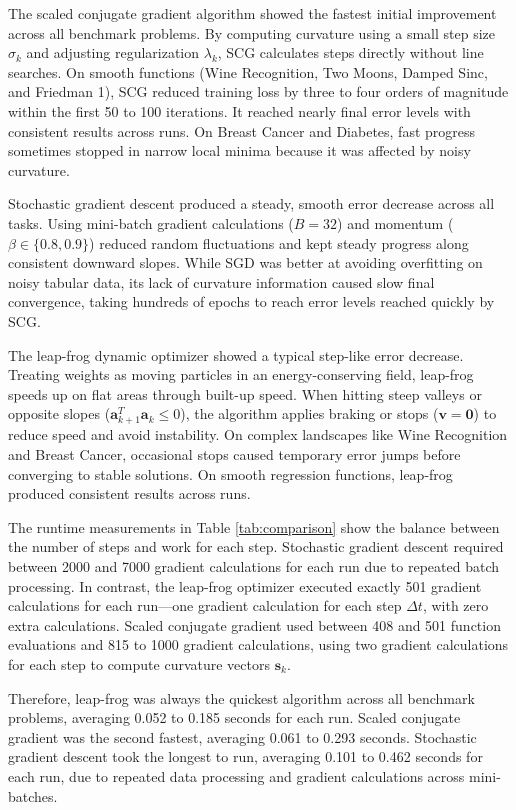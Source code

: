\documentclass[conference,10pt]{IEEEtran}
\begin{document}
The scaled conjugate gradient algorithm showed the fastest initial improvement across all benchmark problems. By computing curvature using a small step size $\sigma_k$ and adjusting regularization $\lambda_k$, SCG calculates steps directly without line searches. On smooth functions (Wine Recognition, Two Moons, Damped Sinc, and Friedman 1), SCG reduced training loss by three to four orders of magnitude within the first 50 to 100 iterations. It reached nearly final error levels with consistent results across runs. On Breast Cancer and Diabetes, fast progress sometimes stopped in narrow local minima because it was affected by noisy curvature.

Stochastic gradient descent produced a steady, smooth error decrease across all tasks. Using mini-batch gradient calculations ($B = 32$) and momentum ($\beta \in \{0.8, 0.9\}$) reduced random fluctuations and kept steady progress along consistent downward slopes. While SGD was better at avoiding overfitting on noisy tabular data, its lack of curvature information caused slow final convergence, taking hundreds of epochs to reach error levels reached quickly by SCG.

The leap-frog dynamic optimizer showed a typical step-like error decrease. Treating weights as moving particles in an energy-conserving field, leap-frog speeds up on flat areas through built-up speed. When hitting steep valleys or opposite slopes ($\mathbf{a}_{k+1}^T \mathbf{a}_k \le 0$), the algorithm applies braking or stops ($\mathbf{v} = \mathbf{0}$) to reduce speed and avoid instability. On complex landscapes like Wine Recognition and Breast Cancer, occasional stops caused temporary error jumps before converging to stable solutions. On smooth regression functions, leap-frog produced consistent results across runs.

The runtime measurements in Table \ref{tab:comparison} show the balance between the number of steps and work for each step. Stochastic gradient descent required between 2000 and 7000 gradient calculations for each run due to repeated batch processing. In contrast, the leap-frog optimizer executed exactly 501 gradient calculations for each run---one gradient calculation for each step $\Delta t$, with zero extra calculations. Scaled conjugate gradient used between 408 and 501 function evaluations and 815 to 1000 gradient calculations, using two gradient calculations for each step to compute curvature vectors $\mathbf{s}_k$.

Therefore, leap-frog was always the quickest algorithm across all benchmark problems, averaging 0.052 to 0.185 seconds for each run. Scaled conjugate gradient was the second fastest, averaging 0.061 to 0.293 seconds. Stochastic gradient descent took the longest to run, averaging 0.101 to 0.462 seconds for each run, due to repeated data processing and gradient calculations across mini-batches.
\end{document}
